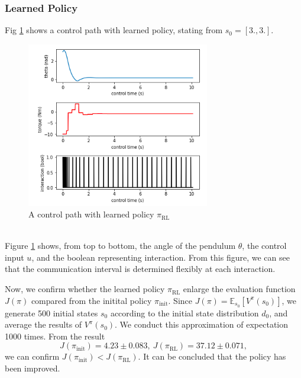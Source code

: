 \documentclass[english, dvipdfmx]{ampmt}             %
\newcommand{\expect}{\mathbb{E}}
\begin{document}
\subsubsection{Learned Policy}
Fig \ref{path_1} shows a control path with learned policy, stating from $s_0 = [3., 3.]$.
\begin{figure}[h]
	\centering
 	\includegraphics[width=8cm]{path_1.png}
 	\caption{A control path with learned policy $\pi_{\textrm{RL}}$} \label{path_1}
\end{figure}\\
Figure \ref{path_1} shows, from top to bottom, the angle of the pendulum $\theta$, the control input $u$, and the boolean representing interaction. From this figure, we can see that the communication interval is determined flexibly at each interaction.\par
Now, we confirm whether the learned policy $\pi_{\textrm{RL}}$ enlarge the evaluation function $J(\pi)$ compared from the initital policy $\pi_{\textrm{init}}$. Since $J(\pi) = \expect_{s_0}[V^{\pi}(s_0)]$, we generate 500 initial states $s_0$ according to the initial state distribution $d_0$, and average the results of $V^{\pi}(s_0)$. We conduct this approximation of expectation 1000 times. From the result
\begin{equation}
	J(\pi_{\textrm{init}}) = 4.23 \pm 0.083,~J(\pi_{\textrm{RL}}) = 37.12 \pm 0.071 \label{compare_policy}, 
\end{equation}
we can confirm $J(\pi_{\textrm{init}}) < J(\pi_{\textrm{RL}})$. It can be concluded that the policy has been improved.
\end{document}
